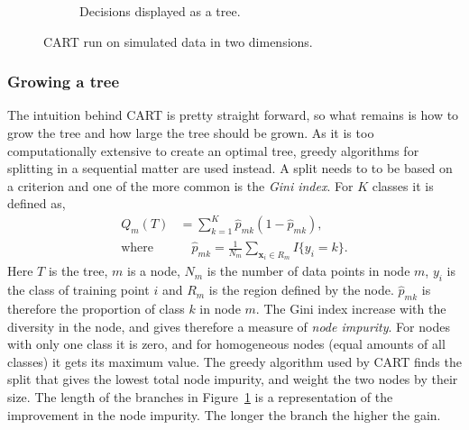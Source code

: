 \begin{figure}[h!]
\begin{subfigure}[b]{0.48\textwidth}
    \caption{Decisions displayed as a tree.}
    \label{fig:cartTree1}
  \end{subfigure}
  \vspace{1\baselineskip}
  \caption{CART run on simulated data in two dimensions. }
  \label{fig:cart}
\end{figure}
%
\subsubsection{Growing a tree}
\label{sub:Growing a tree}

The intuition behind CART is pretty straight forward, so what remains is how to grow the tree and how large the tree should be grown. As it is too computationally extensive to create an optimal tree, greedy algorithms for splitting in a sequential matter are used instead. A split needs to to be based on a criterion and one of the more common is the \textit{Gini index}. For $K$ classes it is defined as,
\begin{align}
  Q_m(T) &= \sum^{K}_{k=1} \hat{p}_{mk} (1 - \hat{p}_{mk}),  \\ 
  \label{eq:pmk} 
  \text{where}& \quad \hat{p}_{mk} = \frac{1}{N_m} \sum_{\mathbf{x}_i \in R_m} I\{y_i = k\}.
\end{align}
Here $T$ is the tree, $m$ is a node, $N_m$ is the number of data points in node $m$, $y_i$ is the class of training point $i$ and $R_m$ is the region defined by the node.
$\hat{p}_{mk}$ is therefore the proportion of class $k$ in node $m$.
The Gini index increase with the diversity in the node, and gives therefore a measure of \textit{node impurity}. For nodes with only one class it is zero, and for homogeneous nodes (equal amounts of all classes) it gets its maximum value. The greedy algorithm used by CART finds the split that gives the lowest total node impurity, and weight the two nodes by their size.  
The length of the branches in Figure~\ref{fig:cartTree1} is a representation of the improvement in the node impurity. The longer the branch the higher the gain.

